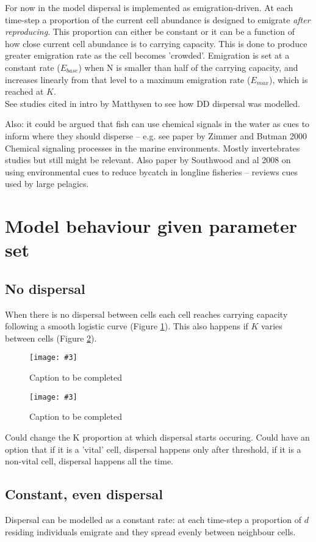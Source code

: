 \documentclass{article}
\newcommand{\addcenterfig}[3][Caption to be completed]{
  \begin{figure}[!h]
    \begin{center}
      \texttt{[image: \#3]}
     \caption{#1 \label{#2}}
    \end{center}
  \end{figure}
}
\begin{document}
For now in the model dispersal is implemented as emigration-driven. At
each time-step a proportion of the current cell abundance is designed
to emigrate \emph{after reproducing}. This proportion can either be
constant or it can be a function of how close current cell abundance
is to carrying capacity. This is done to produce greater emigration
rate as the cell becomes 'crowded'. Emigration is set at a constant
rate ($E_{base}$) when N is smaller than half of the carrying capacity, and
increases linearly from that level to a maximum emigration rate
($E_{max}$), which is reached at $K$.\\

See studies cited in intro by Matthysen to see how DD dispersal was
modelled.

Also: it could be argued that fish can use chemical signals in the
water as cues to inform where they should disperse -- e.g. see paper
by Zimmer and Butman 2000 Chemical signaling processes in the marine
environments. Mostly invertebrates studies but still might be
relevant. Also paper by Southwood and al 2008 on using environmental
cues to reduce bycatch in longline fisheries -- reviews cues used by
large pelagics.

\section{Model behaviour given parameter set}
\subsection{No dispersal}
When there is no dispersal between cells each cell reaches carrying
capacity following a smooth logistic curve (Figure \ref{nodisp}). This
also happens if $K$ varies between cells (Figure \ref{nodisp-core}).

\addcenterfig{nodisp}{Theo-mod_range-contrxn_emigbase-0_emigmax-0_habtype-even.pdf}
\addcenterfig{nodisp-core}{Theo-mod_range-contrxn_emigbase-0_emigmax-0_habtype-core.pdf}

Could change the K proportion at which dispersal starts occuring.
Could have an option that if it is a 'vital' cell, dispersal happens
only after threshold, if it is a non-vital cell, dispersal happens all
the time.
\subsection{Constant, even dispersal}

Dispersal can be modelled as a constant rate: at each time-step a
proportion of $d$ residing individuals emigrate and they spread evenly
between neighbour cells.
\end{document}
